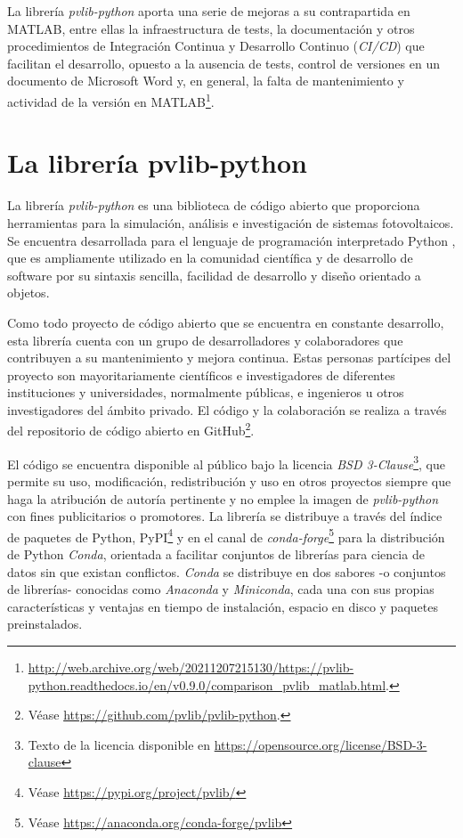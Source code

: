 La librería \textit{pvlib-python} aporta una serie de mejoras a su contrapartida en MATLAB, entre ellas la infraestructura de tests, la documentación y otros procedimientos de Integración Continua y Desarrollo Continuo (\textit{CI/CD}) que facilitan el desarrollo, opuesto a la ausencia de tests, control de versiones en un documento de Microsoft Word y, en general, la falta de mantenimiento y actividad de la versión en MATLAB\footnote{\url{http://web.archive.org/web/20211207215130/https://pvlib-python.readthedocs.io/en/v0.9.0/comparison_pvlib_matlab.html}.}.

\section{La librería pvlib-python} \label{sct:pvlib}

La librería \textit{pvlib-python} es una biblioteca de código abierto que proporciona herramientas para la simulación, análisis e investigación de sistemas fotovoltaicos. Se encuentra desarrollada para el lenguaje de programación interpretado Python \cite{CS-R9526}, que es ampliamente utilizado en la comunidad científica y de desarrollo de software por su sintaxis sencilla, facilidad de desarrollo y diseño orientado a objetos.

Como todo proyecto de código abierto que se encuentra en constante desarrollo, esta librería cuenta con un grupo de desarrolladores y colaboradores que contribuyen a su mantenimiento y mejora continua. Estas personas partícipes del proyecto son mayoritariamente científicos e investigadores de diferentes instituciones y universidades, normalmente públicas, e ingenieros u otros investigadores del ámbito privado. El código y la colaboración se realiza a través del repositorio de código abierto en GitHub\footnote{Véase \url{https://github.com/pvlib/pvlib-python}.}.

El código se encuentra disponible al público bajo la licencia \textit{BSD 3-Clause}\footnote{Texto de la licencia disponible en \url{https://opensource.org/license/BSD-3-clause}}, que permite su uso, modificación, redistribución y uso en otros proyectos siempre que haga la atribución de autoría pertinente y no emplee la imagen de \textit{pvlib-python} con fines publicitarios o promotores. La librería se distribuye a través del índice de paquetes de Python, PyPI\footnote{Véase \url{https://pypi.org/project/pvlib/}} y en el canal de \textit{conda-forge}\footnote{Véase \url{https://anaconda.org/conda-forge/pvlib}} para la distribución de Python \textit{Conda}, orientada a facilitar conjuntos de librerías para ciencia de datos sin que existan conflictos. \textit{Conda} se distribuye en dos sabores -o conjuntos de librerías- conocidas como \textit{Anaconda} y \textit{Miniconda}, cada una con sus propias características y ventajas en tiempo de instalación, espacio en disco y paquetes preinstalados.

